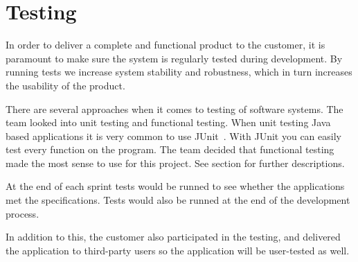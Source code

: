 \chapter{Testing}

In order to deliver a complete and functional product to the customer, it is paramount to make sure the system is regularly tested during development. 
By running tests we increase system stability and robustness, which in turn increases the usability of the product. 

There are several approaches when it comes to testing of software systems. The team looked into unit testing and functional testing.  When unit testing Java based applications it is very common to use JUnit~\cite{junit}.
With JUnit you can easily test every function on the program. The team decided that functional testing made the most sense to use for this project. See section  for further descriptions.

At the end of each sprint tests would be runned to see whether the applications met the specifications. Tests would also be runned at the end of the development process. 

In addition to this, the customer also participated in the testing, and delivered the application to third-party users so the application will be user-tested as well.
\newpage
